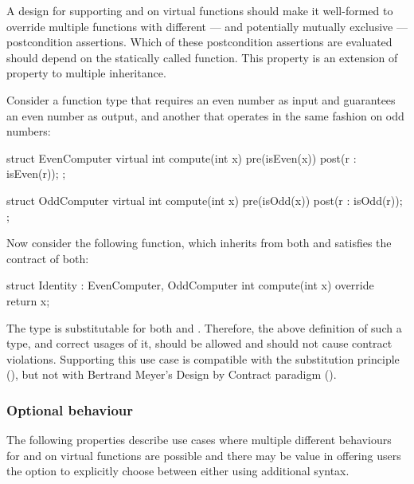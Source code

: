 
A design for supporting  and  on virtual functions should make it well-formed to override multiple functions with different --- and potentially mutually exclusive --- postcondition assertions. Which of these postcondition assertions are evaluated should depend on the statically called function. This property is an extension of property  to multiple inheritance.

Consider a function type that requires
an even number as input and guarantees an even number as output, and another that operates in
the same fashion on odd numbers:

\begin{codeblock}
struct EvenComputer {
  virtual int compute(int x)
    pre(isEven(x))
    post(r : isEven(r));
};

struct OddComputer {
  virtual int compute(int x)
    pre(isOdd(x))
    post(r : isOdd(r));
};
\end{codeblock}

Now consider the following function, which inherits from both and satisfies the contract of both:

\begin{codeblock}
struct Identity : EvenComputer, OddComputer {
  int compute(int x) override { 
    return x; 
  }
}
\end{codeblock}

The type  is substitutable for both  and . Therefore, the above definition of such a type, and correct usages of it, should be allowed and should not cause contract violations. Supporting this use case is compatible with the substitution principle (), but not with Bertrand Meyer's Design by Contract paradigm ().


\subsubsection{Optional behaviour}

The following properties describe use cases where multiple different behaviours for  and  on virtual functions are possible and there may be value in offering users the option to explicitly choose between either using additional syntax.

